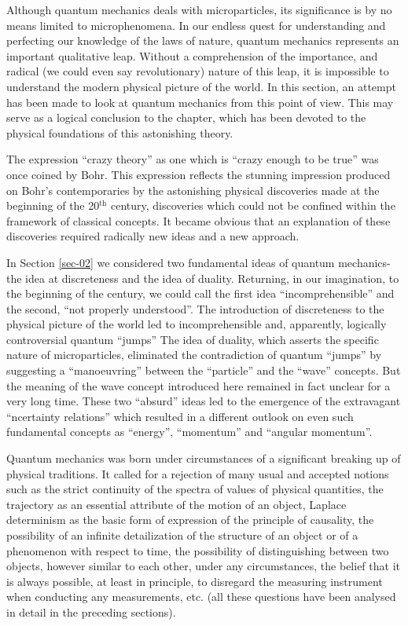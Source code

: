 \documentclass[a4paper,sfsidenotes,colorlinks=true]{tufte-book}
\numberwithin{equation}{section}
\numberwithin{figure}{section}
\begin{document}
Although quantum mechanics deals with microparticles, its significance is by no means limited to microphenomena. In our endless quest for understanding and perfecting our knowledge of the laws of nature, quantum mechanics represents an important qualitative leap. Without a comprehension of the importance, and radical (we could even say revolutionary) nature of this leap, it is impossible to understand the modern physical picture of the world. In this section, an attempt has been made to look at quantum mechanics from this point of view. This may serve as a logical conclusion to the chapter, which has been devoted to the physical foundations of this astonishing theory.


The expression ``crazy theory'' as one
which is ``crazy enough to be true'' was once coined by Bohr. This
expression reflects the stunning impression produced on Bohr's
contemporaries by the astonishing physical discoveries made at the
beginning of the 20$^{\mathrm{th}}$ century, discoveries which could not be
confined within the framework of classical concepts. It became
obvious that an explanation of these discoveries required radically
new ideas and a new approach.


In Section \ref{sec-02} we considered two fundamental ideas of quantum
mechanics-the idea at discreteness and the idea of duality. Returning,
in our imagination, to the beginning of the century, we could call the
first idea ``incomprehensible'' and the second, ``not properly
understood''. The introduction of discreteness to the physical picture
of the world led to incomprehensible and, apparently, logically
controversial quantum ``jumps'' The idea of duality, which asserts the
specific nature of microparticles, eliminated the contradiction of
quantum ``jumps'' by suggesting a ``manoeuvring'' between the
``particle'' and the ``wave'' concepts. But the meaning of the wave
concept introduced here remained in fact unclear for a very long
time. These two ``absurd'' ideas led to the emergence of the
extravagant ``ncertainty relations'' which resulted in a different
outlook on even such fundamental concepts as ``energy'', ``momentum''
and ``angular momentum''.


Quantum mechanics was born under circumstances of a significant breaking up of physical traditions. It called for a rejection of many usual and accepted notions such as the strict continuity of the spectra of values of physical quantities, the trajectory as an essential attribute of the motion of an object, Laplace determinism as the basic form of expression of the principle of causality, the possibility of an infinite detailization of the structure of an object or of a phenomenon with respect to time, the possibility of distinguishing between two objects, however similar to each other, under any circumstances, the belief that it is always possible, at least in principle, to disregard the measuring instrument when conducting any measurements, etc. (all these questions have been analysed in detail in the preceding sections).
\end{document}
